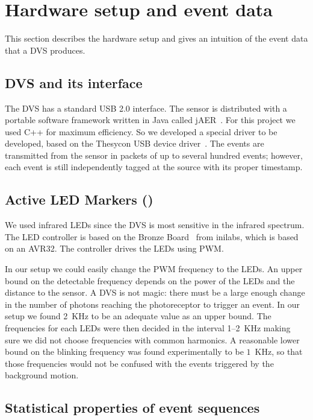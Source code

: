 
\section{Hardware setup and event data\label{sec:Hardware-setup-and}}

This section describes the hardware setup and gives an intuition of
the event data that a DVS produces.


\subsection{DVS and its interface\label{sec:interface}}

The DVS has a standard USB 2.0 interface. The sensor is distributed
with a portable software framework written in Java called jAER~\cite{jaer}.
For this project we used C++ for maximum efficiency. So we developed
a special driver to be developed, based on the Thesycon USB device
driver~\cite{thesycon}. The events are transmitted from the sensor
in packets of up to several hundred events; however, each event is
still independently tagged at the source with its proper timestamp.



\subsection{Active LED Markers (\ALMs)\label{sec:leds}}

We used infrared LEDs since the DVS is most sensitive in the infrared
spectrum.  The LED controller is based on the Bronze Board~\cite{bronzeboard}
from inilabs, which is based on an AVR32.  The controller drives
the LEDs using PWM.



In our setup we could easily change the PWM frequency to the LEDs.
An upper bound on the detectable frequency depends on the power of
the LEDs and the distance to the sensor. A DVS is not magic: there
must be a large enough change in the number of photons reaching the
photoreceptor to trigger an event. In our setup we found 2~KHz to
be an adequate value as an upper bound. The frequencies for each LEDs
were then decided in the interval 1--2~KHz making sure we did not
choose frequencies with common harmonics. A reasonable lower bound
on the blinking frequency was found experimentally to be $1$~KHz,
so that those frequencies would not be confused with the events triggered
by the background motion.


\subsection{Statistical properties of event sequences}

